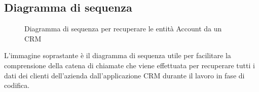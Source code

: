 \subsection{Diagramma di sequenza}
	\begin{figure}[H]
	\centering
	
	\caption{Diagramma di sequenza per recuperare le entità Account da un CRM }
	\label{fig:sdProposals}
\end{figure}

L'immagine soprastante è il diagramma di sequenza utile per facilitare la comprensione della catena di chiamate che viene effettuata per recuperare tutti i dati dei clienti dell'azienda dall'applicazione CRM durante il lavoro in fase di codifica.

